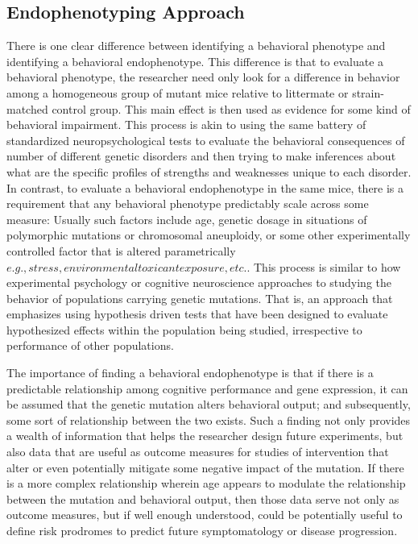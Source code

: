 \documentclass{article}
\begin{document}
\subsection{Endophenotyping Approach}
There is one clear difference between identifying a behavioral phenotype and identifying a behavioral endophenotype. This difference is that to evaluate a behavioral phenotype, the researcher need only look for a difference in behavior among a homogeneous group of mutant mice relative to littermate or strain-matched control group. This main effect is then used as evidence for some kind of behavioral impairment. This process is akin to using the same battery of standardized neuropsychological tests to evaluate the behavioral consequences of number of different genetic disorders and then trying to make inferences about what are the specific profiles of strengths and weaknesses unique to each disorder. In contrast, to evaluate a behavioral endophenotype in the same mice, there is a requirement that any behavioral phenotype predictably scale across some measure: Usually such factors include age, genetic dosage in situations of polymorphic mutations or chromosomal aneuploidy, or some other experimentally controlled factor that is altered parametrically \(e.g., stress, environmental toxicant exposure, etc.\). This process is similar to how experimental psychology or cognitive neuroscience approaches to studying the behavior of populations carrying genetic mutations. That is, an approach that emphasizes using hypothesis driven tests that have been designed to evaluate hypothesized effects within the population being studied, irrespective to performance of other populations.

The importance of finding a behavioral endophenotype is that if there is a predictable relationship among cognitive performance and gene expression, it can be assumed that the genetic mutation alters behavioral output; and subsequently, some sort of relationship between the two exists. Such a finding not only provides a wealth of information that helps the researcher design future experiments, but also data that are useful as outcome measures for studies of intervention that alter or even potentially mitigate some negative impact of the mutation. If there is a more complex relationship wherein age appears to modulate the relationship between the mutation and behavioral output, then those data serve not only as outcome measures, but if well enough understood, could be potentially useful to define risk prodromes to predict future symptomatology or disease progression.
\end{document}
